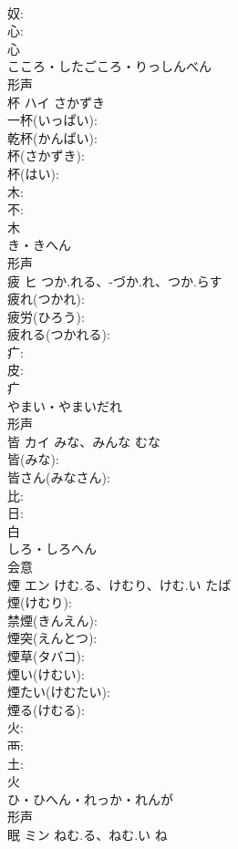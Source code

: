 \documentclass[8pt]{extreport}
\begin{document}
\begin{CJK}{UTF8}{min}
\\	奴: 
\\	心: 
\\	心	
\\	こころ・したごころ・りっしんべん	
\\	形声 
\\	杯	ハイ	さかずき		
\\	一杯(いっぱい): 
\\	乾杯(かんぱい): 
\\	杯(さかずき): 
\\	杯(はい): 
\\	木: 
\\	不: 
\\	木	
\\	き・きへん	
\\	形声 
\\	疲	ヒ	つか.れる、-づか.れ、つか.らす		
\\	疲れ(つかれ): 
\\	疲労(ひろう): 
\\	疲れる(つかれる): 
\\	疒: 
\\	皮: 
\\	疒	
\\	やまい・やまいだれ	
\\	形声 
\\	皆	カイ	みな、みんな	むな	
\\	皆(みな): 
\\	皆さん(みなさん): 
\\	比: 
\\	日: 
\\	白	
\\	しろ・しろへん	
\\	会意 
\\	煙	エン	けむ.る、けむり、けむ.い	たば	
\\	煙(けむり): 
\\	禁煙(きんえん): 
\\	煙突(えんとつ): 
\\	煙草(タバコ): 
\\	煙い(けむい): 
\\	煙たい(けむたい): 
\\	煙る(けむる): 
\\	火: 
\\	襾: 
\\	土: 
\\	火	
\\	ひ・ひへん・れっか・れんが	
\\	形声 
\\	眠	ミン	ねむ.る、ねむ.い	ね	

\end{CJK}
\end{document}

